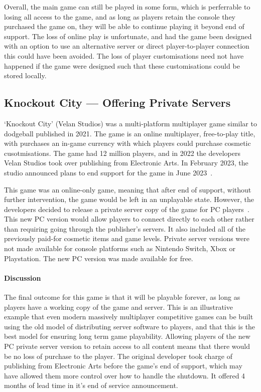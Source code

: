 Overall, the main game can still be played in some form, which is perferrable to losing all access to the game,
and as long as players retain the console they purchased the game on, they will be able to continue playing it beyond end of support.
The loss of online play is unfortunate, and had the game been designed with an option to use an alternative server or direct player-to-player connection this could have been avoided.
The loss of player customisations need not have happened if the game were designed such that these customisations could be stored locally.


\subsection{Knockout City --- Offering Private Servers}
`Knockout City' (Velan Studios) was a multi-platform multiplayer game similar to dodgeball published in 2021.
The game is an online multiplayer, free-to-play title, with purchases an in-game currency with which players could purchase cosmetic cusotmisations.
The game had 12 million players\cite{knockout-stats}, and in 2022 the developers Velan Studios took over publishing from Electronic Arts.
In February 2023, the studio announced plans to end support for the game in June 2023~\cite{knockout-eos-2023}.

This game was an online-only game, meaning that after end of support, without further intervention, the game would be left in an unplayable state.
However, the developers decided to release a private server copy of the game for PC players~\cite{knockout-private}.
This new PC version would allow players to connect directly to each other rather than requiring going through the publisher's servers.
It also included all of the previously paid-for cosmetic items and game levels.
Private server versions were not made available for console platforms such as Nintendo Switch, Xbox or Playstation.
The new PC version was made available for free.

\paragraph*{Discussion}
The final outcome for this game is that it will be playable forever, as long as players have a working copy of the game and server.
This is an illustrative example that even modern massively multiplayer competitive games can be built using the old model of distributing server software to players,
and that this is the best model for ensuring long term game playability.
Allowing players of the new PC private server version to retain access to all content means that there would be no loss of purchase to the player.
The original developer took charge of publishing from Electronic Arts before the game's end of support, which may have allowed them more control over how to handle the shutdown.
It offered 4 months of lead time in it's end of service announcement.

